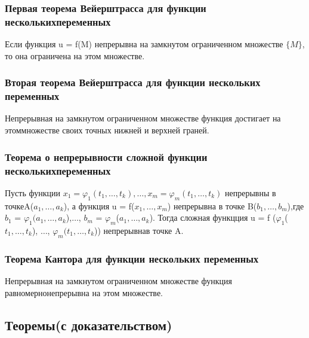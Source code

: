 \documentclass[a4paper, 12pt]{article}
\renewcommand{\phi}{\varphi}
\def\newline{}%
\begin{document}
            \subsubsection{Первая теорема Вейерштрасса для функции нескольких\newline переменных}

            Если функция u = f(M) непрерывна на замкнутом ограниченном множестве $\{M\}$, то она ограничена на этом множестве.

            \subsubsection{Вторая теорема Вейерштрасса для функции нескольких переменных}

            Непрерывная на замкнутом ограниченном множестве функция достигает на
            этом\newline множестве своих точных нижней и верхней граней.

            \subsubsection{Теорема о непрерывности сложной функции нескольких\newline переменных}

            Пусть функции $x_1 = {\phi}_1(t_1,\ldots,t_k),\ldots, x_m = {\phi}_m(t_1,\ldots ,t_k)$ непрерывны в точке\newline A($a_1,\ldots, a_k$), а функция
            u = f($x_1, \ldots, x_m$) непрерывна в точке B($b_1, \ldots, b_m$),\newline где $b_1$ = ${\phi}_1(a_1, \ldots, a_k$),$\ldots$, $b_m$ = ${\phi}_m$($a_1, \ldots, a_k$).\newline
            Тогда сложная функцция u = f (${\phi}_1$($t_1, \ldots,t_k$), $\ldots$, ${\phi}_m(t_1, \ldots, t_k$)) непрерывна\newline в точке A.
            \subsubsection{Теорема Кантора для функции нескольких переменных}

            Непрерывная на замкнутом ограниченном множестве функция равномерно\newline непрерывна на этом множестве.
            
        \subsection{Теоремы(с доказательством)}
\end{document}
